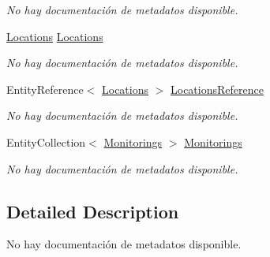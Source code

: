 \begin{DoxyCompactItemize}
\begin{DoxyCompactList}\small\item\em No hay documentación de metadatos disponible. \end{DoxyCompactList}\item 
\hyperlink{class_microsoft_1_1_samples_1_1_kinect_1_1_basic_interactions_1_1_locations}{Locations} \hyperlink{class_microsoft_1_1_samples_1_1_kinect_1_1_basic_interactions_1_1_advert_hosts_a2dcd2900cf2b83858903deb005c2a576}{Locations}
\begin{DoxyCompactList}\small\item\em No hay documentación de metadatos disponible. \end{DoxyCompactList}\item 
Entity\-Reference$<$ \hyperlink{class_microsoft_1_1_samples_1_1_kinect_1_1_basic_interactions_1_1_locations}{Locations} $>$ \hyperlink{class_microsoft_1_1_samples_1_1_kinect_1_1_basic_interactions_1_1_advert_hosts_aad706c9d580fb02808a8a4574b16dc55}{Locations\-Reference}
\begin{DoxyCompactList}\small\item\em No hay documentación de metadatos disponible. \end{DoxyCompactList}\item 
Entity\-Collection$<$ \hyperlink{class_microsoft_1_1_samples_1_1_kinect_1_1_basic_interactions_1_1_monitorings}{Monitorings} $>$ \hyperlink{class_microsoft_1_1_samples_1_1_kinect_1_1_basic_interactions_1_1_advert_hosts_a721bcdfcb2bdbf22dcdb82a684d707b4}{Monitorings}
\begin{DoxyCompactList}\small\item\em No hay documentación de metadatos disponible. \end{DoxyCompactList}\end{DoxyCompactItemize}


\subsection{Detailed Description}
No hay documentación de metadatos disponible. 



